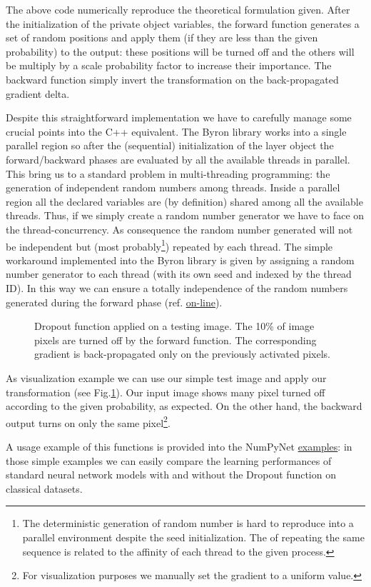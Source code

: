 \documentclass{standalone}
\begin{document}
The above code numerically reproduce the theoretical formulation given.
After the initialization of the private object variables, the forward function generates a set of random positions and apply them (if they are less than the given probability) to the output: these positions will be turned off and the others will be multiply by a scale probability factor to increase their importance.
The backward function simply invert the transformation on the back-propagated gradient \textsf{delta}.

Despite this straightforward implementation we have to carefully manage some crucial points into the C++ equivalent.
The Byron library works into a single parallel region so after the (sequential) initialization of the layer object the forward/backward phases are evaluated by all the available threads in parallel.
This bring us to a standard problem in multi-threading programming: the generation of independent random numbers among threads.
Inside a parallel region all the declared variables are (by definition) shared among all the available threads.
Thus, if we simply create a random number generator we have to face on the thread-concurrency.
As consequence the random number generated will not be independent but (most probably\footnote{
  The deterministic generation of random number is hard to reproduce into a parallel environment despite the seed initialization.
  The  of repeating the same sequence is related to the affinity of each thread to the given process.
}) repeated by each thread.
The simple workaround implemented into the Byron library is given by assigning a random number generator to each thread (with its own seed and indexed by the thread ID).
In this way we can ensure a totally independence of the random numbers generated during the forward phase (ref. \href{https://github.com/Nico-Curti/Byron/blob/master/src/dropout_layer.cpp}{on-line}).

\begin{figure}[htbp]
\centering
\def\svgwidth{0.8\textwidth}

\caption{Dropout function applied on a testing image.
The 10\% of image pixels are turned off by the forward function.
The corresponding gradient is back-propagated only on the previously activated pixels.
}
\label{fig:dropout}
\end{figure}

As visualization example we can use our simple test image and apply our transformation (see Fig.\ref{fig:dropout}).
Our input image shows many pixel turned off according to the given probability, as expected.
On the other hand, the backward output turns on only the same pixel\footnote{
  For visualization purposes we manually set the gradient to a uniform value.
}.

A usage example of this functions is provided into the NumPyNet \href{https://github.com/Nico-Curti/NumPyNet/tree/master/examples}{examples}: in those simple examples we can easily compare the learning performances of standard neural network models with and without the Dropout function on classical datasets.
\end{document}
